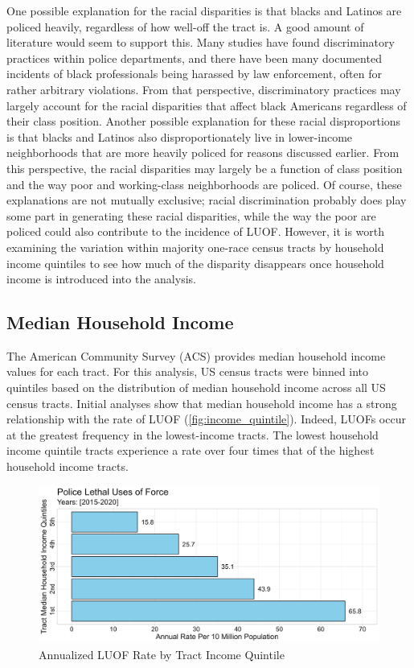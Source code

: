 \documentclass[12pt]{article}
\begin{document}
One possible explanation for the racial disparities is that blacks and Latinos are policed heavily, regardless of how well-off the tract is. A good amount of literature would seem to support this. Many studies have found discriminatory practices within police departments, and there have been many documented incidents of black professionals being harassed by law enforcement, often for rather arbitrary violations. From that perspective, discriminatory practices may largely account for the racial disparities that affect black Americans regardless of their class position. Another possible explanation for these racial disproportions is that blacks and Latinos also disproportionately live in lower-income neighborhoods that are more heavily policed for reasons discussed earlier. From this perspective, the racial disparities may largely be a function of class position and the way poor and working-class neighborhoods are policed. Of course, these explanations are not mutually exclusive; racial discrimination probably does play some part in generating these racial disparities, while the way the poor are policed could also contribute to the incidence of LUOF. However, it is worth examining the variation within majority one-race census tracts by household income quintiles to see how much of the disparity disappears once household income is introduced into the analysis.

\subsection{Median Household Income}

The American Community Survey (ACS) provides median household income values for each tract. For this analysis, US census tracts were binned into quintiles based on the distribution of median household income across all US census tracts. Initial analyses show that median household income has a strong relationship with the rate of LUOF (\autoref{fig:income_quintile}). Indeed, LUOFs occur at the greatest frequency in the lowest-income tracts. The lowest household income quintile tracts experience a rate over four times that of the highest household income tracts.

\begin{figure}[H]
  \centering %
  \includegraphics[width=\linewidth]{images/income_quintiles_only_ind}
  \captionsetup{justification=centering, singlelinecheck=false, margin=2cm}
  \caption[Annualized LUOF Rate by Tract Income Quintile]{Annualized LUOF Rate by Tract Income Quintile}
  \label{fig:income_quintile}
\end{figure}
\end{document}

